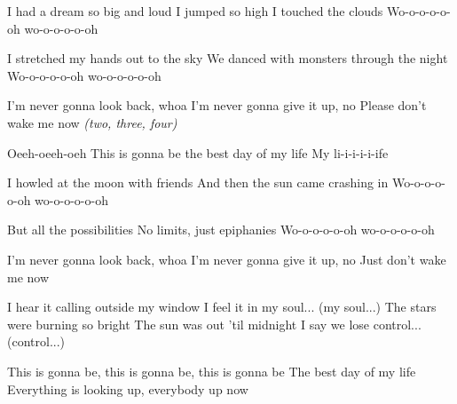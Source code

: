   \begin{samepage}
\begin{verse*}
I had a dream so big and loud
I jumped so high I touched the clouds
Wo-o-o-o-o-oh
wo-o-o-o-o-oh
\end{verse*}

\begin{verse*}
I stretched my hands out to the sky
We danced with monsters through the night
Wo-o-o-o-o-oh
wo-o-o-o-o-oh
\end{verse*}

\begin{bridge*}
I'm never gonna look back, whoa
I'm never gonna give it up, no
Please don't wake me now
\textit{(two, three, four)}
\end{bridge*}

\begin{chorus}
Oeeh-oeeh-oeh
This is gonna be the best day of my life
My li-i-i-i-i-ife
\end{chorus}

\thechorus

\begin{verse*}
I howled at the moon with friends
And then the sun came crashing in
Wo-o-o-o-o-oh
wo-o-o-o-o-oh
\end{verse*}

\begin{verse*}
But all the possibilities
No limits, just epiphanies
Wo-o-o-o-o-oh
wo-o-o-o-o-oh
\end{verse*}

\begin{bridge*}
I'm never gonna look back, whoa
I'm never gonna give it up, no
Just don't wake me now
\end{bridge*}

\thechorus[2]

\begin{bridge*}
I hear it calling
outside my window
I feel it in my soul... (my soul...)
The stars were burning so bright
The sun was out 'til midnight
I say we lose control... (control...)
\end{bridge*}

\thechorus[2]

\begin{bridge*}
This is gonna be, this is gonna be, this is gonna be
The best day of my life
Everything is looking up, everybody up now
\end{bridge*}

\thechorus
  \end{samepage}
